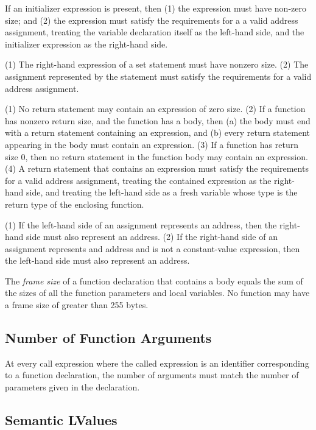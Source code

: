 \documentclass[10pt]{article}
\begin{document}
 If an initializer expression is
present, then (1) the expression must have non-zero size; and (2) the
expression must satisfy the requirements for a a valid address
assignment, treating the variable declaration itself as the left-hand
side, and the initializer expression as the right-hand side.

 (1) The right-hand expression of a set
statement must have nonzero size.  (2) The assignment represented by
the statement must satisfy the requirements for a valid address
assignment.

 (1) No return statement may contain an
expression of zero size.  (2) If a function has nonzero return size,
and the function has a body, then (a) the body must end with a return
statement containing an expression, and (b) every return statement
appearing in the body must contain an expression.  (3) If a function
has return size 0, then no return statement in the function body may
contain an expression. (4) A return statement that contains an
expression must satisfy the requirements for a valid address
assignment, treating the contained expression as the right-hand side,
and treating the left-hand side as a fresh variable whose type is the
return type of the enclosing function.

 (1) If the left-hand side of an
assignment represents an address, then the right-hand side must also
represent an address. (2) If the right-hand side of an assignment
represents and address and is not a constant-value expression, then
the left-hand side must also represent an address.

 The \emph{frame size} of a function
declaration that contains a body equals the sum of the sizes of all
the function parameters and local variables.  No function may have a
frame size of greater than 255 bytes.

\subsection{Number of Function Arguments}
\label{sec:semantics:fn-args}

At every call expression where the called expression is an identifier
corresponding to a function declaration, the number of arguments must
match the number of parameters given in the declaration.

\subsection{Semantic LValues}
\label{sec:semantics:lvalues}
\end{document}
